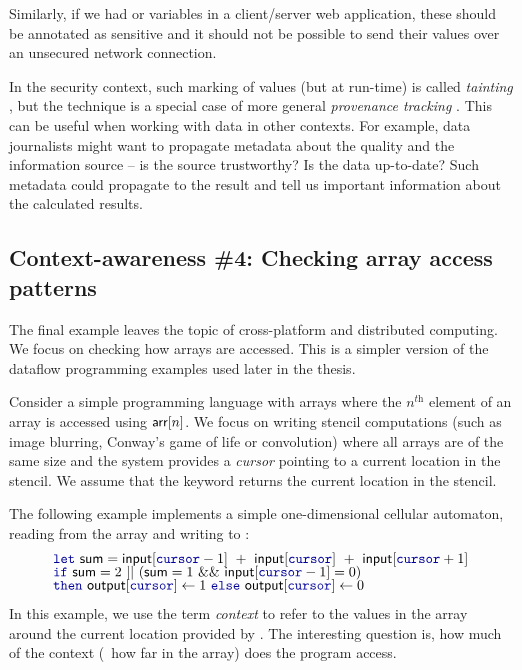 Similarly, if we had  or  variables in a client/server web application,
these should be annotated as sensitive and it should not be possible to send their values over an
unsecured network connection.

In the security context, such marking of values (but at run-time) is called \emph{tainting}
\cite{app-tainting-sql}, but the technique is a special case of more general \emph{provenance
tracking} \cite{app-provenance-future}. This can be useful when working with data in other contexts.
For example, data journalists might want to propagate metadata about the quality and the
information source -- is the source trustworthy? Is the data up-to-date? Such metadata could
propagate to the result and tell us important information about the calculated results.


\subsection{Context-awareness \#4: Checking array access patterns}
\label{sec:intro-why-array}

The final example leaves the topic of cross-platform and distributed computing. We focus on
checking how arrays are accessed. This is a simpler version of the dataflow programming
examples used later in the thesis.

Consider a simple programming language with arrays where the $n^{\textit{th}}$ element of an
array  is accessed using $\textnormal{\sffamily arr}[n]$. We focus on writing stencil computations
(such as image blurring, Conway's game of life or convolution) where all arrays are of
the same size and the system provides a \emph{cursor} pointing to a current location in the
stencil. We assume that the keyword  returns the current location in the stencil.

The following example implements a simple one-dimensional cellular automaton, reading from the
 array and writing to :
%
\begin{equation*}
\begin{array}{l}
\kvd{let}~\ident{sum}=\ident{input}[\kvd{cursor} - 1] ~+~ \ident{input}[\kvd{cursor}] ~+~ \ident{input}[\kvd{cursor} + 1]\\[-0.25em]
\kvd{if}~\ident{sum}=2 ~||~ (\ident{sum}=1 ~\&\&~ \ident{input}[\kvd{cursor} - 1] = 0)\\[-0.25em]
\kvd{then}~\ident{output}[\kvd{cursor}] \leftarrow 1 ~\kvd{else}~\ident{output}[\kvd{cursor}] \leftarrow 0
\end{array}
\end{equation*}
%
In this example, we use the term \emph{context} to refer to the values in the array around the
current location provided by . The interesting question is, how much of the context
(\ie~how far in the array) does the program access.

